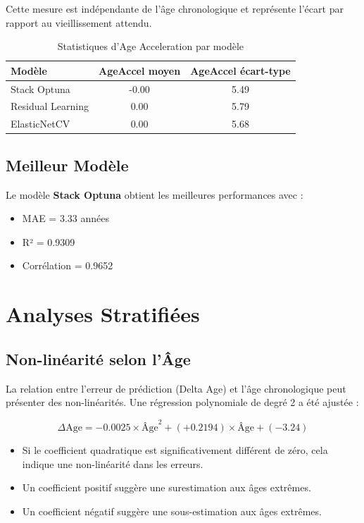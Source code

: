 \documentclass[11pt,a4paper]{article}
\begin{document}
Cette mesure est indépendante de l'âge chronologique et représente l'écart par rapport 
au vieillissement attendu.

\begin{table}[htbp]
\centering
\begin{tabular}{lcc}
\hline
\textbf{Modèle} & \textbf{AgeAccel moyen} & \textbf{AgeAccel écart-type} \\
\hline
Stack Optuna & -0.00 & 5.49 \\
Residual Learning & 0.00 & 5.79 \\
ElasticNetCV & 0.00 & 5.68 \\
\hline
\end{tabular}
\caption{Statistiques d'Age Acceleration par modèle}
\label{tab:age_accel}
\end{table}

\subsection{Meilleur Modèle}

Le modèle \textbf{Stack Optuna} obtient les meilleures performances avec :
\begin{itemize}
    \item MAE = 3.33 années
    \item R² = 0.9309
    \item Corrélation = 0.9652
\end{itemize}

\section{Analyses Stratifiées}

\subsection{Non-linéarité selon l'Âge}

La relation entre l'erreur de prédiction (Delta Age) et l'âge chronologique peut 
présenter des non-linéarités. Une régression polynomiale de degré 2 a été ajustée :

\begin{equation}
\Delta\text{Age} = -0.0025 \times \text{Âge}^2 + (+0.2194) \times \text{Âge} + (-3.24)
\end{equation}

\begin{itemize}
    \item Si le coefficient quadratique est significativement différent de zéro, 
          cela indique une non-linéarité dans les erreurs.
    \item Un coefficient positif suggère une surestimation aux âges extrêmes.
    \item Un coefficient négatif suggère une sous-estimation aux âges extrêmes.
\end{itemize}
\end{document}
